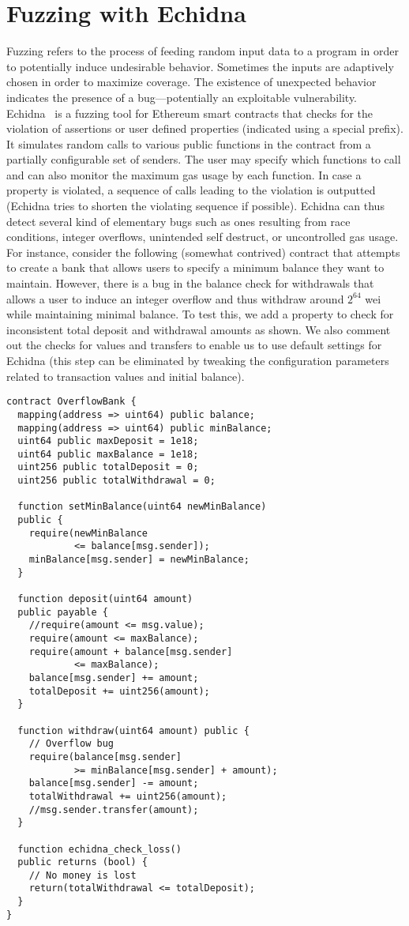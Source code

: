 \section{Fuzzing with Echidna}
Fuzzing refers to the process of feeding random input data to a program in order to potentially induce undesirable behavior. Sometimes the inputs are adaptively chosen in order to maximize coverage. The existence of unexpected behavior indicates the presence of a bug---potentially an exploitable vulnerability. Echidna~\cite{echidna} is a fuzzing tool for Ethereum smart contracts that checks for the violation of assertions or user defined properties (indicated using a special prefix). It simulates random calls to various public functions in the contract from a partially configurable set of senders. The user may specify which functions to call and can also monitor the maximum gas usage by each function. In case a property is violated, a sequence of calls leading to the violation is outputted (Echidna tries to shorten the violating sequence if possible). Echidna can thus detect several kind of elementary bugs such as ones resulting from race conditions, integer overflows, unintended self destruct, or uncontrolled gas usage. For instance, consider the following (somewhat contrived) contract that attempts to create a bank that allows users to specify a minimum balance they want to maintain. However, there is a bug in the balance check for withdrawals that allows a user to induce an integer overflow and thus withdraw around $2^{64}$ wei while maintaining minimal balance. To test this, we add a property to check for inconsistent total deposit and withdrawal amounts as shown. We also comment out the checks for values and transfers to enable us to use default settings for Echidna (this step can be eliminated by tweaking the configuration parameters related to transaction values and initial balance).
\begin{lstlisting}[basicstyle=\small]
contract OverflowBank {
  mapping(address => uint64) public balance;  
  mapping(address => uint64) public minBalance;   
  uint64 public maxDeposit = 1e18;
  uint64 public maxBalance = 1e18; 
  uint256 public totalDeposit = 0;
  uint256 public totalWithdrawal = 0;

  function setMinBalance(uint64 newMinBalance) 
  public {
    require(newMinBalance 
            <= balance[msg.sender]);
    minBalance[msg.sender] = newMinBalance;
  }

  function deposit(uint64 amount) 
  public payable {
    //require(amount <= msg.value);
    require(amount <= maxBalance);
    require(amount + balance[msg.sender] 
            <= maxBalance);
    balance[msg.sender] += amount;
    totalDeposit += uint256(amount);
  }

  function withdraw(uint64 amount) public {
    // Overflow bug
    require(balance[msg.sender] 
            >= minBalance[msg.sender] + amount); 
    balance[msg.sender] -= amount;
    totalWithdrawal += uint256(amount);
    //msg.sender.transfer(amount);
  }

  function echidna_check_loss() 
  public returns (bool) {
    // No money is lost
    return(totalWithdrawal <= totalDeposit); 
  }
}
\end{lstlisting}

